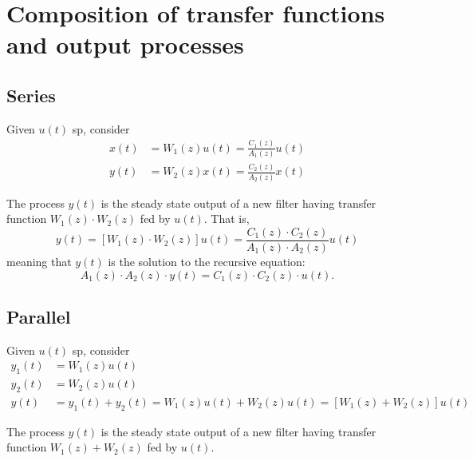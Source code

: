 
\section{Composition of transfer functions and output processes}
\subsection{Series}
Given $u(t)$ \gls{sp}, consider
\begin{align*}
	x(t)&=W_{1}(z)u(t)=\frac{C_{1}(z)}{A_{1}(z)}u(t)\\
	y(t)&=W_{2}(z)x(t)=\frac{C_{2}(z)}{A_{2}(z)}x(t)
\end{align*}
\begin{figure}[htpb]
	\centering
\end{figure}
\FloatBarrier

\begin{theorem}
	The process $y(t)$ is the steady state output of a new filter having transfer function $W_{1}(z)\cdot W_{2}(z)$ fed by $u(t)$. That is,
	\[
		y(t)=[W_{1}(z)\cdot W_{2}(z)]u(t)=\frac{C_{1}(z)\cdot C_{2}(z)}{A_{1}(z)\cdot A_{2}(z)}u(t)
	\]
	meaning that $y(t)$ is the solution to the recursive equation:
	\[
		A_{1}(z)\cdot A_{2}(z)\cdot y(t) = C_{1}(z)\cdot C_{2}(z)\cdot u(t).
	\]
\end{theorem}

\subsection{Parallel}
Given $u(t)$ \gls{sp}, consider
\begin{align*}
	y_{1}(t)&=W_{1}(z)u(t)\\
	y_{2}(t)&=W_{2}(z)u(t)\\
	y(t)&=y_{1}(t)+y_{2}(t)=W_{1}(z)u(t)+W_{2}(z)u(t)=[W_{1}(z)+W_{2}(z)]u(t)
\end{align*}
\begin{theorem}
	The process $y(t)$ is the steady state output of a new filter having transfer function $W_{1}(z)+W_{2}(z)$ fed by $u(t)$.
\end{theorem}

